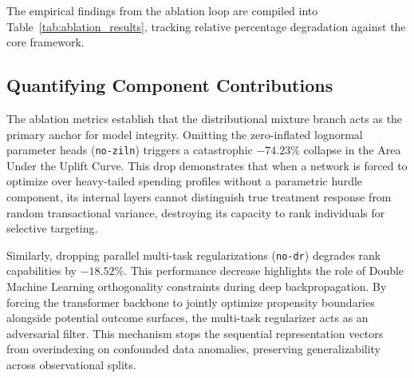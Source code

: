 \documentclass[10pt, conference]{IEEEtran}
\begin{document}
The empirical findings from the ablation loop are compiled into Table~\ref{tab:ablation_results}, tracking relative percentage degradation against the core framework.

\begin{table}[h]
\centering
{}
\caption{Systematic Structural Ablation Ledger. Metrics demonstrate the relative impact on rank prioritization capacity caused by isolating individual deep components.}
\label{tab:ablation_results}
\end{table}

\subsection{Quantifying Component Contributions}
The ablation metrics establish that the distributional mixture branch acts as the primary anchor for model integrity. Omitting the zero-inflated lognormal parameter heads (\texttt{no-ziln}) triggers a catastrophic \textbf{$-74.23\%$} collapse in the Area Under the Uplift Curve. This drop demonstrates that when a network is forced to optimize over heavy-tailed spending profiles without a parametric hurdle component, its internal layers cannot distinguish true treatment response from random transactional variance, destroying its capacity to rank individuals for selective targeting.

Similarly, dropping parallel multi-task regularizations (\texttt{no-dr}) degrades rank capabilities by \textbf{$-18.52\%$}. This performance decrease highlights the role of Double Machine Learning orthogonality constraints during deep backpropagation. By forcing the transformer backbone to jointly optimize propensity boundaries alongside potential outcome surfaces, the multi-task regularizer acts as an adversarial filter. This mechanism stops the sequential representation vectors from overindexing on confounded data anomalies, preserving generalizability across observational splits.
\end{document}
